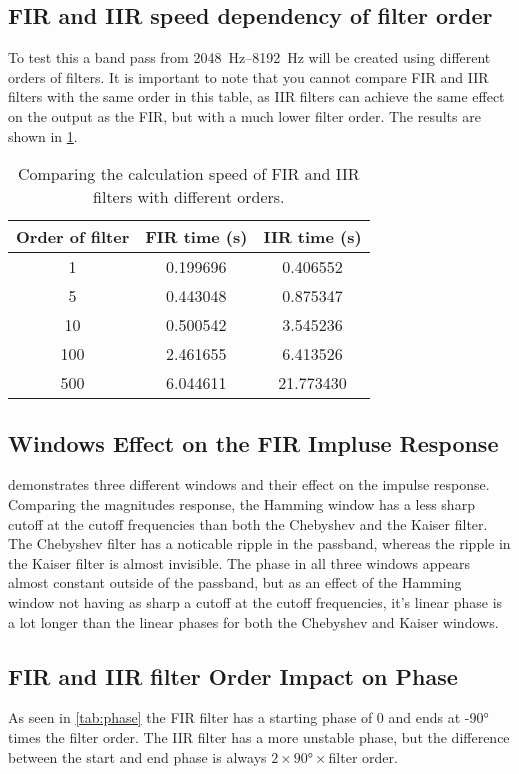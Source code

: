 \subsection{FIR and IIR speed dependency of filter order}
To test this a band pass from \SIrange{2048}{8192}{\hertz} will be created using different orders of filters. It is important to note that you cannot compare FIR and IIR filters with the same order in this table, as IIR filters can achieve the same effect on the output as the FIR, but with a much lower filter order. The results are shown in \cref{tab:order_speed}.
\begin{table}[!htb]
	\centering
	\caption{Comparing the calculation speed of FIR and IIR filters with different orders.}
	\label{tab:order_speed}
	\begin{tabular}{ccc}
		Order of filter & FIR time (\si{\second}) & IIR time (\si{\second}) \\
		\midrule
		1		&	\num{0.199696} & \num{0.406552}\\
		5		& \num{0.443048} & \num{0.875347} \\
		10		& \num{0.500542}	 & \num{3.545236}\\
		100		& \num{2.461655}	 & \num{6.413526} \\
		500		& \num{6.044611}	 & \num{21.773430} \\
	\end{tabular}
\end{table}

\subsection{Windows Effect on the FIR Impluse Response}
 demonstrates three different windows and their effect on the impulse response. Comparing the magnitudes response, the Hamming window has a less sharp cutoff at the cutoff frequencies than both the Chebyshev and the Kaiser filter. The Chebyshev filter has a noticable ripple in the passband, whereas the ripple in the Kaiser filter is almost invisible. The phase in all three windows appears almost constant outside of the passband, but as an effect of the Hamming window not having as sharp a cutoff at the cutoff frequencies, it's linear phase is a lot longer than the linear phases for both the Chebyshev and Kaiser windows.

\subsection{FIR and IIR filter Order Impact on Phase}
As seen in \cref{tab:phase} the FIR filter has a starting phase of \num{0} and ends at \ang{-90} times the filter order. The IIR filter has a more unstable phase, but the difference between the start and end phase is always $2\times\ang{90}\times$filter order.

